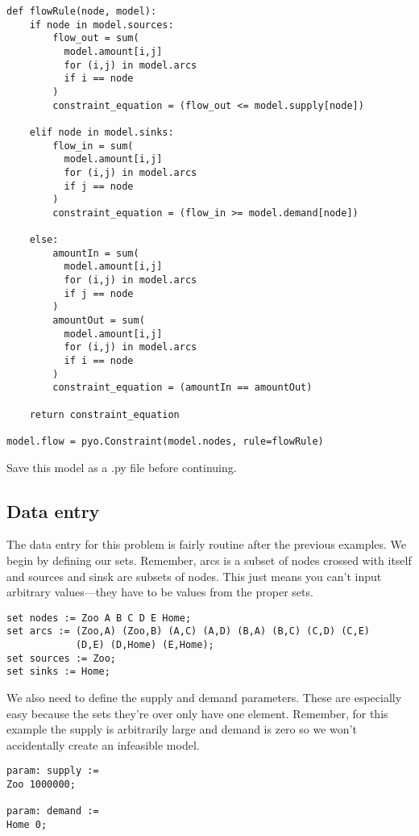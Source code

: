 \documentclass{article}
\begin{document}
\begin{verbatim}
def flowRule(node, model):
    if node in model.sources:
        flow_out = sum(
          model.amount[i,j] 
          for (i,j) in model.arcs 
          if i == node
        )
        constraint_equation = (flow_out <= model.supply[node])
    
    elif node in model.sinks:
        flow_in = sum(
          model.amount[i,j]
          for (i,j) in model.arcs
          if j == node
        )
        constraint_equation = (flow_in >= model.demand[node])
    
    else:
        amountIn = sum(
          model.amount[i,j] 
          for (i,j) in model.arcs 
          if j == node
        )
        amountOut = sum(
          model.amount[i,j] 
          for (i,j) in model.arcs 
          if i == node
        )
        constraint_equation = (amountIn == amountOut)
        
    return constraint_equation
    
model.flow = pyo.Constraint(model.nodes, rule=flowRule)
\end{verbatim}

Save this model as a .py file before continuing.

\subsection*{Data entry}

The data entry for this problem is fairly routine after the previous examples.  We begin by defining our sets.  Remember, arcs is a subset of nodes crossed with itself and sources and sinsk are subsets of nodes.  This just means you can't input arbitrary values---they have to be values from the proper sets.

\begin{verbatim}
set nodes := Zoo A B C D E Home;
set arcs := (Zoo,A) (Zoo,B) (A,C) (A,D) (B,A) (B,C) (C,D) (C,E) 
            (D,E) (D,Home) (E,Home);
set sources := Zoo;
set sinks := Home;
\end{verbatim}

We also need to define the supply and demand parameters.  These are especially easy because the sets they're over only have one element.  Remember, for this example the supply is arbitrarily large and demand is zero so we won't accidentally create an infeasible model.

\begin{verbatim}
param: supply :=
Zoo 1000000;

param: demand :=
Home 0;
\end{verbatim}
\end{document}
